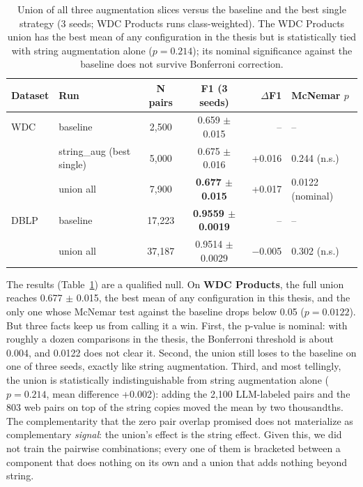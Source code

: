 \documentclass[a4paper,oneside,bibliography=totoc]{scrbook}
\begin{document}
\begin{table}[!htbp]
  \centering
  \small
  \setlength{\tabcolsep}{3pt}
  \begin{tabular}{llccrl}
    \toprule
    \textbf{Dataset} & \textbf{Run} & \textbf{N pairs} & \textbf{F1 (3 seeds)} & \textbf{$\Delta$F1} & \textbf{McNemar $p$} \\
    \midrule
    WDC & baseline & 2{,}500 & 0.659 $\pm$ 0.015 & -- & -- \\
        & string\_aug (best single) & 5{,}000 & 0.675 $\pm$ 0.016 & +0.016 & 0.244 (n.s.) \\
        & union all & 7{,}900 & \textbf{0.677 $\pm$ 0.015} & +0.017 & 0.0122 (nominal) \\
    \midrule
    DBLP & baseline & 17{,}223 & \textbf{0.9559 $\pm$ 0.0019} & -- & -- \\
         & union all & 37{,}187 & 0.9514 $\pm$ 0.0029 & $-$0.005 & 0.302 (n.s.) \\
    \bottomrule
  \end{tabular}
  \caption{Union of all three augmentation slices versus the baseline and the best single strategy (3 seeds; WDC Products runs class-weighted). The WDC Products union has the best mean of any configuration in the thesis but is statistically tied with string augmentation alone ($p = 0.214$); its nominal significance against the baseline does not survive Bonferroni correction.}
  \label{tab:union}
\end{table}

The results (Table~\ref{tab:union}) are a qualified null. On \textbf{WDC Products}, the full union reaches 0.677 $\pm$ 0.015, the best mean of any configuration in this thesis, and the only one whose McNemar test against the baseline drops below 0.05 ($p = 0.0122$). But three facts keep us from calling it a win. First, the p-value is nominal: with roughly a dozen comparisons in the thesis, the Bonferroni threshold is about 0.004, and 0.0122 does not clear it. Second, the union still loses to the baseline on one of three seeds, exactly like string augmentation. Third, and most tellingly, the union is statistically indistinguishable from string augmentation alone ($p = 0.214$, mean difference +0.002): adding the 2{,}100 LLM-labeled pairs and the 803 web pairs on top of the string copies moved the mean by two thousandths. The complementarity that the zero pair overlap promised does not materialize as complementary \emph{signal}: the union's effect is the string effect. Given this, we did not train the pairwise combinations; every one of them is bracketed between a component that does nothing on its own and a union that adds nothing beyond string.
\end{document}
